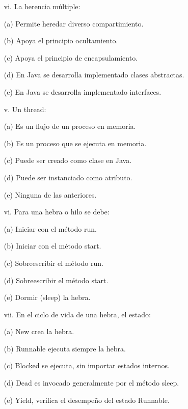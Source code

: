 \documentclass[10pt]{article}
\begin{document}
\begin{enumerate}
{\begin{multicols}{2}
    \begin{enumerate}[label=(\alph*)]
        \item[vi.] La herencia m\'ultiple:
        \item[(a)] Permite heredar diverso compartimiento.
        \item[(b)] Apoya el principio ocultamiento.
        \item[(c)] Apoya el principio de encapsulamiento.
        \item[(d)] En Java se desarrolla implementado clases abstractas.
        \item[(e)] En Java se desarrolla implementado interfaces.
    \end{enumerate}

    \begin{enumerate}[label=(\alph*)]
        \item[v.] Un thread: 
		\item[(a)] Es un flujo de un proceso en memoria.        
        \item[(b)] Es un proceso que se ejecuta en memoria.
        \item[(c)] Puede ser creado como clase en Java.
        \item[(d)] Puede ser instanciado como atributo.
        \item[(e)] Ninguna de las anteriores.
    \end{enumerate}

    \begin{enumerate}[label=(\alph*)]
        \item[vi.] Para una hebra o hilo se debe:
        \item[(a)] Iniciar con el m\'etodo run.
        \item[(b)] Iniciar con el m\'etodo start.
        \item[(c)] Sobreescribir el m\'etodo run.
        \item[(d)] Sobreescribir el m\'etodo start.
        \item[(e)] Dormir (sleep) la hebra.
    \end{enumerate}

    \begin{enumerate}[label=(\alph*)]
        \item[vii.] En el ciclo de vida de una hebra, el estado: 
        \item[(a)] New crea la hebra.
        \item[(b)] Runnable ejecuta siempre la hebra.
        \item[(c)] Blocked se ejecuta, sin importar estados internos.
        \item[(d)] Dead es invocado generalmente por el m\'etodo sleep.
        \item[(e)] Yield, verifica el desempe\~no del estado Runnable.
    \end{enumerate}


\end{multicols}}
\end{enumerate}
\end{document}
